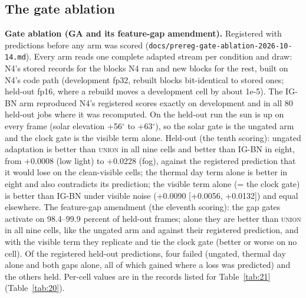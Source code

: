 \documentclass[journal,onecolumn]{IEEEtran}
\begin{document}
\subsection{The gate ablation}\label{app:G.5}
\textbf{Gate ablation (GA and its feature-gap amendment).} Registered with predictions before any arm was scored (\texttt{docs/\allowbreak{}prereg-\allowbreak{}gate-\allowbreak{}ablation-\allowbreak{}2026-\allowbreak{}10-\allowbreak{}14.md}). Every arm reads one complete adapted stream per condition and draw: N4's stored records for the blocks N4 ran and new blocks for the rest, built on N4's code path (development fp32, rebuilt blocks bit-identical to stored ones; held-out fp16, where a rebuild moves a development cell by about 1e-5). The \mbox{IG-BN} arm reproduced N4's registered scores exactly on development and in all 80 held-out jobs where it was recomputed. On the held-out run the sun is up on every frame (solar elevation +56$^{\circ}$ to +63$^{\circ}$), so the solar gate is the ungated arm and the clock gate is the visible term alone. Held-out (the tenth scoring): ungated adaptation is better than \textsc{union} in all nine cells and better than \mbox{IG-BN} in eight, from +0.0008 (low light) to +0.0228 (fog), against the registered prediction that it would lose on the clean-visible cells; the thermal day term alone is better in eight and also contradicts its prediction; the visible term alone (= the clock gate) is better than \mbox{IG-BN} under visible noise (+0.0090 [+0.0056, +0.0132]) and equal elsewhere. The feature-gap amendment (the eleventh scoring): the gap gates activate on 98.4--99.9 percent of held-out frames; alone they are better than \textsc{union} in all nine cells, like the ungated arm and against their registered prediction, and with the visible term they replicate and tie the clock gate (better or worse on no cell). Of the registered held-out predictions, four failed (ungated, thermal day alone and both gaps alone, all of which gained where a loss was predicted) and the others held. Per-cell values are in the records listed for Table~\ref{tab:21} (Table~\ref{tab:20}).
\end{document}
